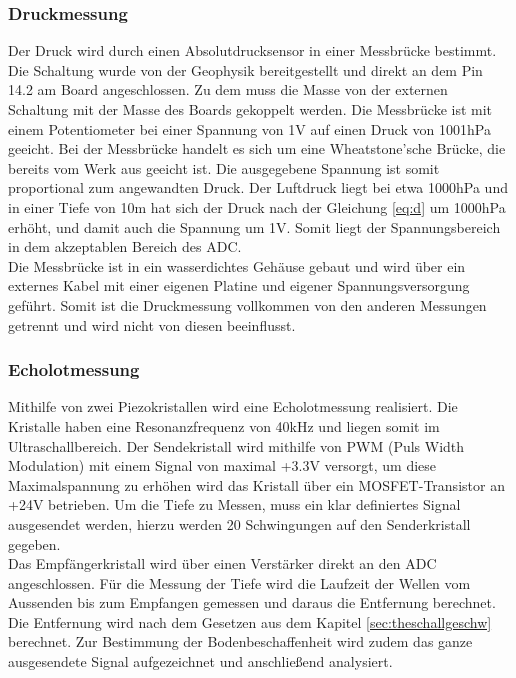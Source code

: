 \documentclass[12pt,a4paper,titlepage,headinclude,bibtotoc]{scrartcl}
\numberwithin{equation}{subsection}
\begin{document}
\subsubsection{Druckmessung}
\label{sec:durchdruck}
Der Druck wird durch einen Absolutdrucksensor in einer Messbrücke bestimmt.
Die Schaltung wurde von der Geophysik bereitgestellt und direkt an dem Pin 14.2 am Board angeschlossen.
Zu dem muss die Masse von der externen Schaltung mit der Masse des Boards gekoppelt werden.
Die Messbrücke ist mit einem Potentiometer bei einer Spannung von 1\si{\volt} auf einen Druck von 1001hPa geeicht.
Bei der Messbrücke handelt es sich um  eine Wheatstone'sche Brücke, die bereits vom Werk aus geeicht ist.
Die ausgegebene Spannung ist somit proportional zum angewandten Druck.
Der Luftdruck liegt bei etwa 1000hPa und in einer Tiefe von 10\si{\meter} hat sich der Druck nach der Gleichung \eqref{eq:d} um 1000hPa erhöht, und damit auch die Spannung um 1\si{\volt}.
Somit liegt der Spannungsbereich in dem akzeptablen Bereich des ADC.\\
Die Messbrücke ist in ein wasserdichtes Gehäuse gebaut und wird über ein externes Kabel mit einer eigenen Platine und eigener Spannungsversorgung geführt.
Somit ist die Druckmessung vollkommen von den anderen Messungen getrennt und wird nicht von diesen beeinflusst.

\subsubsection{Echolotmessung}
Mithilfe von zwei Piezokristallen wird eine Echolotmessung realisiert.
Die Kristalle haben eine Resonanzfrequenz von 40\si{\kilo\hertz} und liegen somit im Ultraschallbereich.
Der Sendekristall wird mithilfe von PWM (Puls Width Modulation) mit einem Signal von maximal +3.3\si{\volt} versorgt, um diese Maximalspannung zu erhöhen wird das Kristall über ein MOSFET-Transistor an +24\si{\volt} betrieben.
Um die Tiefe zu Messen, muss ein klar definiertes Signal ausgesendet werden, hierzu werden 20 Schwingungen auf den Senderkristall gegeben.\\
Das Empfängerkristall wird über einen Verstärker direkt an den ADC angeschlossen.
Für die Messung der Tiefe wird die Laufzeit der Wellen vom Aussenden bis zum Empfangen gemessen und daraus die Entfernung berechnet.
Die Entfernung wird nach dem Gesetzen aus dem Kapitel \ref{sec:theschallgeschw} berechnet.
Zur Bestimmung der Bodenbeschaffenheit wird zudem das ganze ausgesendete Signal aufgezeichnet und anschließend analysiert.
\end{document}
